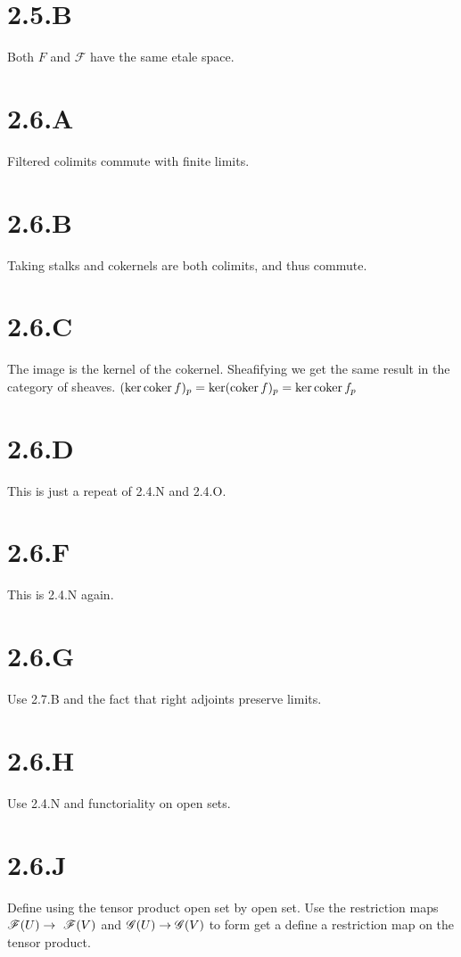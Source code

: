 \documentclass{article}
\begin{document}
\section*{2.5.B}
Both $F$ and $\mathscr{F}$ have the same etale space.

\section*{2.6.A}
Filtered colimits commute with finite limits.

\section*{2.6.B}
Taking stalks and cokernels are both colimits, and thus commute.

\section*{2.6.C}
The image is the kernel of the cokernel. Sheafifying we get the same result in the category of
sheaves. $(\ker \operatorname{coker} f)_p=\ker (\operatorname{coker} f)_p = \ker \operatorname{coker} f_p$

\section*{2.6.D}
This is just a repeat of 2.4.N and 2.4.O.

\section*{2.6.F}
This is 2.4.N again.

\section*{2.6.G}
Use 2.7.B and the fact that right adjoints preserve limits.

\section*{2.6.H}
Use 2.4.N and functoriality on open sets.

\section*{2.6.J}
Define using the tensor product open set by open set. Use the restriction maps $\operatorname{\mathscr{F}}(U) \to \
    \operatorname{\mathscr{F}}(V)$ and $\operatorname{\mathscr{G}}(U) \to \operatorname{\mathscr{G}}(V)$ to form get a define a restriction map on the tensor product.
\end{document}
